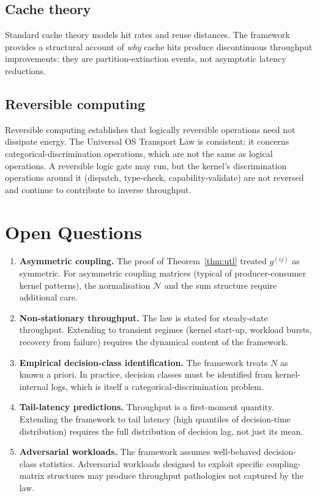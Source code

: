\documentclass[twocolumn,11pt,a4paper]{article}
\newcommand{\Norm}{\mathcal{N}}
\begin{document}
\subsection{Cache theory}

Standard cache theory \citep{smith1982cache, mattson1970evaluation} models hit rates and reuse distances. The framework provides a structural account of \emph{why} cache hits produce discontinuous throughput improvements: they are partition-extinction events, not asymptotic latency reductions.

\subsection{Reversible computing}

Reversible computing \citep{bennett1973logical, bennett1982} establishes that logically reversible operations need not dissipate energy. The Universal OS Transport Law is consistent: it concerns categorical-discrimination operations, which are not the same as logical operations. A reversible logic gate may run, but the kernel's discrimination operations around it (dispatch, type-check, capability-validate) are not reversed and continue to contribute to inverse throughput.

\section{Open Questions}
\label{sec:open}

\begin{enumerate}[nosep,leftmargin=*]
\item \textbf{Asymmetric coupling.} The proof of Theorem~\ref{thm:utl} treated $g^{(ij)}$ as symmetric. For asymmetric coupling matrices (typical of producer-consumer kernel patterns), the normalisation $\Norm$ and the sum structure require additional care.
\item \textbf{Non-stationary throughput.} The law is stated for steady-state throughput. Extending to transient regimes (kernel start-up, workload bursts, recovery from failure) requires the dynamical content of the framework.
\item \textbf{Empirical decision-class identification.} The framework treats $N$ as known a priori. In practice, decision classes must be identified from kernel-internal logs, which is itself a categorical-discrimination problem.
\item \textbf{Tail-latency predictions.} Throughput is a first-moment quantity. Extending the framework to tail latency (high quantiles of decision-time distribution) requires the full distribution of decision lag, not just its mean.
\item \textbf{Adversarial workloads.} The framework assumes well-behaved decision-class statistics. Adversarial workloads designed to exploit specific coupling-matrix structures may produce throughput pathologies not captured by the law.
\end{enumerate}
\end{document}
